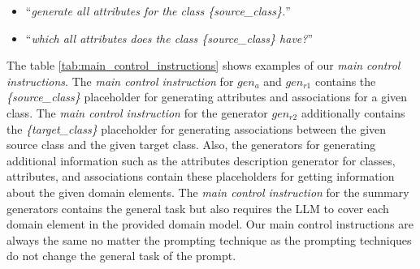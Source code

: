 \begin{itemize}
\item ``\textit{generate all attributes for the class \{source\_class\}.}''
\item ``\textit{which all attributes does the class \{source\_class\} have?}''
\end{itemize}

The table \ref{tab:main_control_instructions} shows examples of our \emph{main control instructions}. The \emph{main control instruction} for $gen_a$ and $gen_{r1}$ contains the \textit{\{source\_class\}} placeholder for generating attributes and associations for a given class. The \emph{main control instruction} for the generator $gen_{r2}$ additionally contains the \textit{\{target\_class\}} placeholder for generating associations between the given source class and the given target class. Also, the generators for generating additional information such as the attributes description generator for classes, attributes, and associations contain these placeholders for getting information about the given domain elements. The \emph{main control instruction} for the summary generators contains the general task but also requires the LLM to cover each domain element in the provided domain model.
Our main control instructions are always the same no matter the prompting technique as the prompting techniques do not change the general task of the prompt.


